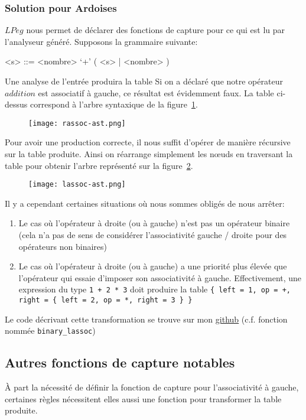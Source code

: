 \documentclass{article}
\begin{document}
\subsubsection{Solution pour Ardoises}
$LPeg$ nous permet de déclarer des fonctions de capture pour ce qui est lu par l'analyseur généré. Supposons la grammaire suivante:
\begin{grammar}
	<s> ::= <nombre> `+' ( <s> | <nombre> )
\end{grammar}
Une analyse de l'entrée  \noindent produira la table 
\noindent Si on a déclaré que notre opérateur $addition$ est associatif à gauche, ce résultat est évidemment faux. La table ci-dessus correspond à l'arbre syntaxique de la figure~\ref{fig:rassocast}. 
\begin{figure}[!h]
	\centering
	\texttt{[image: rassoc-ast.png]}
	\caption{}
	\label{fig:rassocast}
\end{figure}
Pour avoir une production correcte, il nous suffit d'opérer de manière récursive sur la table produite. Ainsi on réarrange simplement les nœuds en traversant la table pour obtenir l'arbre représenté sur la figure~\ref{fig:lassocast}.
\begin{figure}[h]
	\centering
	\texttt{[image: lassoc-ast.png]}
	\caption{}
	\label{fig:lassocast}
\end{figure}
Il y a cependant certaines situations où nous sommes obligés de nous arrêter:
\begin{enumerate}
	\item Le cas où l'opérateur à droite (ou à gauche) n'est pas un opérateur binaire (cela n'a pas de sens de considérer l'associativité gauche / droite pour des opérateurs non binaires)
	\item Le cas où l'opérateur à droite (ou à gauche) a une priorité plus élevée que l'opérateur qui essaie d'imposer son associativité à gauche. Effectivement, une expression du type \lstinline|1 + 2 * 3| doit produire la table \lstinline|{ left = 1, op = +, right = { left = 2, op = *, right = 3 } }|
\end{enumerate}
Le code décrivant cette transformation se trouve sur mon \underline{\href{https://github.com/LGabAnnell/formalisms/blob/dev/src/parser.lua\#L139}{github}} (c.f. fonction nommée \lstinline|binary_lassoc|)
\subsection{Autres fonctions de capture notables}
À part la nécessité de définir la fonction de capture pour l'associativité à gauche, certaines règles nécessitent elles aussi une fonction pour transformer la table produite.
\end{document}

